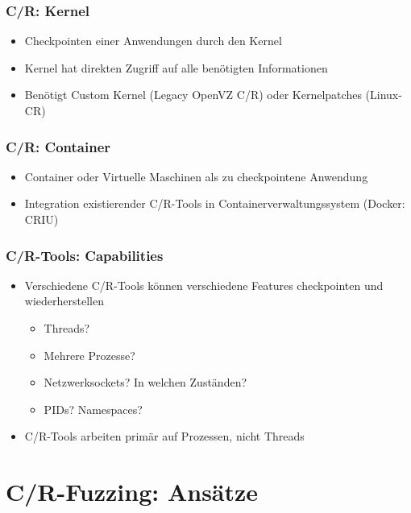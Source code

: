 \documentclass[handout]{beamer}
\begin{document}
\begin{frame}
    \frametitle{C/R: Kernel}
    \begin{itemize}
        \item Checkpointen einer Anwendungen durch den Kernel
        \item Kernel hat direkten Zugriff auf alle benötigten Informationen
        \item Benötigt Custom Kernel (Legacy OpenVZ C/R) oder Kernelpatches (Linux-CR)
    \end{itemize}
\end{frame}

\begin{frame}
    \frametitle{C/R: Container}
    \begin{itemize}
        \item Container oder Virtuelle Maschinen als zu checkpointene Anwendung
        \item Integration existierender C/R-Tools in Containerverwaltungssystem (Docker: CRIU)
    \end{itemize}
\end{frame}

\begin{frame}
    \frametitle{C/R-Tools: Capabilities}
    \begin{itemize}
        \item Verschiedene C/R-Tools können verschiedene Features checkpointen und wiederherstellen
            \begin{itemize}
                \item Threads?
                \item Mehrere Prozesse?
                \item Netzwerksockets? In welchen Zuständen?
                \item PIDs? Namespaces?
            \end{itemize}
        \item C/R-Tools arbeiten primär auf Prozessen, nicht Threads
    \end{itemize}
\end{frame}

\section{C/R-Fuzzing: Ansätze}
\end{document}
